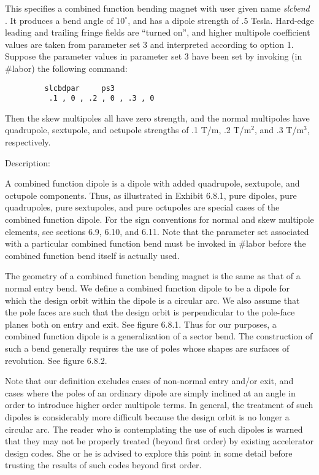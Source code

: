 This specifies a combined function bending magnet with user given name
{\em slcbend }.  It produces a bend angle of $10^{\circ}$, and has a dipole strength
of .5 Tesla.  Hard-edge leading and trailing fringe fields are ``turned on'',
and higher multipole coefficient values are taken from parameter set 3 and
interpreted according to option 1.  Suppose the parameter values in
parameter set 3 have been set by invoking (in \#labor) the following command:
\begin{verbatim}
         slcbdpar     ps3
          .1 , 0 , .2 , 0 , .3 , 0
\end{verbatim}
Then the skew multipoles all have zero strength, and the normal multipoles
have quadrupole, sextupole, and octupole strengths of .1 T/m, .2 T/$\mbox{m}^2$, and
.3 T/$\mbox{m}^3$, respectively.

\vspace{5mm}
     Description:
\vspace{2mm}

    A combined function dipole is a dipole with added quadrupole,
	sextupole, and octupole components.  Thus, as illustrated in Exhibit
	6.8.1, pure dipoles, pure quadrupoles, pure sextupoles, and pure
	octupoles are special cases of the combined function dipole.  For the sign conventions for normal and skew multipole elements, see sections 6.9, 6.10, and 6.11.  Note that the parameter set associated with a particular combined function bend must be invoked in \#labor before the combined function bend itself is actually used.

The geometry of a combined function bending magnet is the same as that of a normal entry bend.   We define a combined function dipole to be a dipole for which the design orbit within the dipole is a circular arc.  We also assume that the pole faces are such that the design orbit is perpendicular to the pole-face planes both on entry and exit.  See figure 6.8.1.  Thus for our purposes, a combined function dipole is a generalization of a sector bend.  The construction of such a bend generally requires the use of poles whose shapes are surfaces of revolution.  See figure 6.8.2.

Note that our definition excludes cases of non-normal entry and/or exit, and cases where the poles of an ordinary dipole are simply inclined at an angle in order to introduce higher order multipole terms.  In general, the treatment of such dipoles is considerably more difficult because the design orbit is no longer a circular arc.  The reader who is contemplating the use of such dipoles is warned that they may not be properly treated (beyond first order) by existing accelerator design codes.  She or he is advised to explore this point in some detail before trusting the results of such codes beyond first order.

